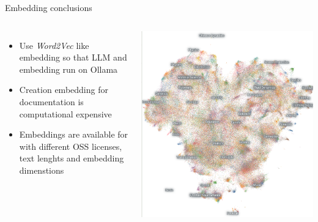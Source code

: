 \documentclass[aspectratio=169]{beamer}
\begin{document}
\begin{frame}{Embedding conclusions}
\begin{columns}
\begin{itemize}
  \item Use \emph{Word2Vec} like embedding so that LLM and embedding run on Ollama
  \item Creation embedding for documentation is computational expensive
  \item Embeddings are available for with different OSS licenses, text lenghts and embedding dimenstions
\end{itemize}
  \includegraphics[width=\linewidth]{Noimic}
\end{columns}
\end{frame}
\end{document}
